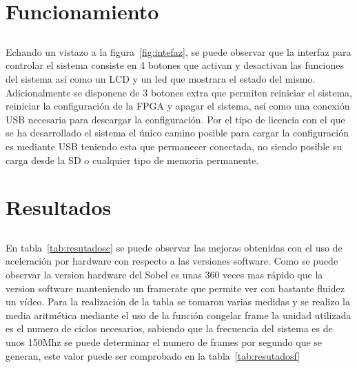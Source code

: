 \documentclass[a4paper,12pt,titlepage,final]{book}
\begin{document}
\section{Funcionamiento}
\subsection*{}
\subsubsection*{}
\paragraph{}
Echando un vistazo a la figura~\ref{fig:intefaz}, se puede observar que la interfaz para controlar el sistema consiste en 4 botones que activan y desactivan las funciones del sistema así como un LCD y un led que mostrara el estado del mismo. Adicionalmente se disponene de 3 botones extra que permiten reiniciar el sistema, reiniciar la configuración de la FPGA y apagar el sistema, así como una conexión USB necesaria para descargar la configuración. Por el tipo de licencia con el que se ha desarrollado el sistema el único camino posible para cargar la configuración es mediante USB teniendo esta que permanecer conectada, no siendo posible su carga desde la SD o cualquier tipo de memoria permanente.

\section{Resultados}
\subsection*{}
\subsubsection*{}
\paragraph{}
En tabla~\ref{tab:resutadosc} se puede observar las mejoras obtenidas con el uso de aceleración por hardware con respecto a las versiones software. Como se puede observar la version hardware del Sobel es unas 360 veces mas rápido que la version software manteniendo un framerate que permite ver con bastante fluidez un vídeo. Para la realización de la tabla se tomaron varias medidas y se realizo la media aritmética mediante el uso de la función congelar frame la unidad utilizada es el numero de ciclos necesarios, sabiendo que la frecuencia del sistema es de unos 150Mhz se puede determinar el numero de frames por segundo que se generan, este valor puede ser comprobado en la tabla~\ref{tab:resutadosf}
\end{document}
